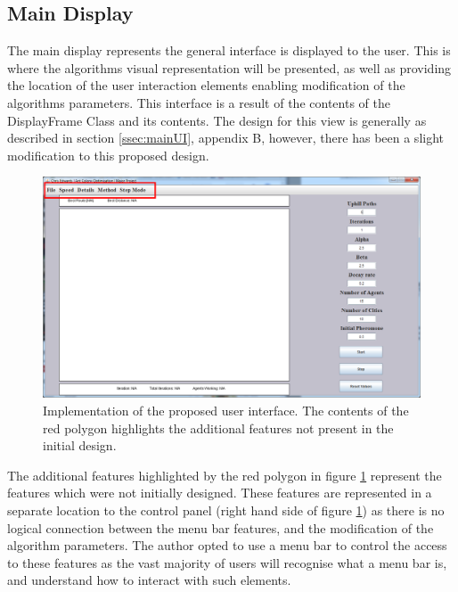 \subsection{Main Display}
\label{mainimp}
The main display represents the general interface is displayed to the user. This is where the algorithms visual representation will be presented, as well as providing the location of the user interaction elements enabling modification of the algorithms parameters. This interface is a result of the contents of the DisplayFrame Class and its contents. The design for this view is generally as described in section \ref{ssec:mainUI}, appendix B, however, there has been a slight modification to this proposed design.

\begin{figure}[H]
\centering
\includegraphics[scale=0.35]{Images/chapter4/displayFrame}
\caption{Implementation of the proposed user interface. The contents of the red polygon highlights the additional features not present in the initial design.}
\label{fig:displayFrameImp}
\end{figure}

The additional features highlighted by the red polygon in figure \ref{fig:displayFrameImp} represent the features which were not initially designed. These features are represented in a separate location to the control panel (right hand side of figure \ref{fig:displayFrameImp}) as there is no logical connection between the menu bar features, and the modification of the algorithm parameters. The author opted to use a menu bar to control the access to these features as the vast majority of users will recognise what a menu bar is, and understand how to interact with such elements. 

